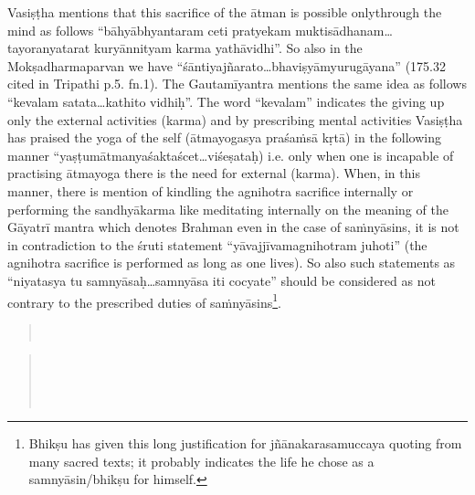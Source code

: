 Vasiṣṭha mentions that this sacrifice of the ātman is possible only\break through the mind as follows “bāhyābhyantaram ceti pratyekam mukti\-sādhanam…\-tayoranyatarat kuryānnityam karma yathāvidhi”. So also in the Mokṣadharmaparvan we have “śāntiyajñarato…bhaviṣyāmyuru\-gāyana” (175.32 cited in Tripathi p.5. fn.1).  The Gautamīyantra mentions the same idea as follows “kevalam satata…kathito vidhiḥ”. The word “kevalam” indicates the giving up only the external activities (karma) and by prescribing mental activities Vasiṣṭha has praised the yoga of the self (ātmayogasya praśaṁsā kṛtā) in the following manner “yaṣṭumātmanyaśaktaścet…viśeṣataḥ) i.e. only when one is incapable of practising ātmayoga there is the need for external (karma). When, in this manner, there is mention of kindling the agnihotra sacrifice internally or performing the sandhyākarma like meditating internally on the meaning of the Gāyatrī mantra which denotes Brahman even in the case of saṁnyāsins, it is not in contradiction to the śruti statement “yāvajjīvamagnihotram juhoti” (the agnihotra sacrifice is performed as long as one lives). So also such statements as “niyatasya tu samnyāsaḥ…samnyāsa iti cocyate” should be considered as not contrary to the prescribed duties of saṁnyāsins\footnote{Bhikṣu has given this long justification for jñānakarasamuccaya quoting from many sacred texts; it probably indicates the life he chose as a samnyāsin/bhikṣu for himself.}.

\begin{verse}
\\
\end{verse}
\begin{verse}
\\
\\
\\
\end{verse}

